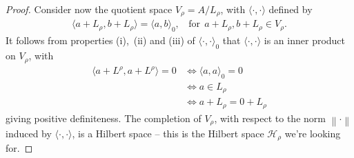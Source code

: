 \documentclass[11pt,a4paper]{report}
\theoremstyle{plain}
\theoremstyle{definition}
\newcommand{\1}{\mathbbm{1}}
\newcommand{\Hr}{\mathcal{H}_\rho}
\begin{document}
\begin{proof}
	
	Consider now the quotient space $V_\rho = A / L_\rho$, with $\langle 
	\cdot,\cdot\rangle$ defined by
	\begin{align*}
		\langle a+L_\rho,b+L_\rho \rangle = \langle a,b\rangle_0, ~~~~ 
		\mbox{for}~~a+L_\rho,b+L_\rho \in V_\rho.
	\end{align*}
	It follows from properties (i),~(ii) and (iii) of $\langle \cdot,\cdot  \rangle 
	_0$ that $\langle \cdot,\cdot  \rangle$ is an inner product on $V_\rho$, with
	\begin{align*}
				\langle a + L^\rho, a + L^\rho \rangle = 0
		&\iff 	\langle a,a\rangle_0=0													\\
		&\iff 	a \in L_\rho															\\
		&\iff 	a+L_\rho = 0+L_\rho
	\end{align*}
	giving positive definiteness.
	The completion of $V_\rho$, with respect to the norm $\left\|\cdot\right\|$ 
	induced by $\langle\cdot,\cdot \rangle$, is a Hilbert space -- this is the 
	Hilbert space $\Hr$ we're looking for.


\end{proof}
\end{document}
